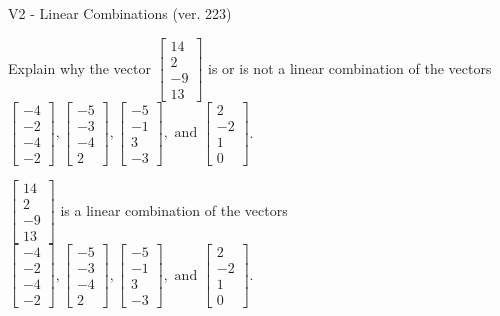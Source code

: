 \begin{exercise}
  \begin{exerciseTitle}V2 - Linear Combinations (ver. 223)\end{exerciseTitle}
  \begin{exerciseStatement}
    Explain why the vector \(\left[\begin{array}{c}
14 \\
2 \\
-9 \\
13
\end{array}\right]\)  is or is not a linear 
	combination of the vectors \(\left[\begin{array}{c}
-4 \\
-2 \\
-4 \\
-2
\end{array}\right] , \left[\begin{array}{c}
-5 \\
-3 \\
-4 \\
2
\end{array}\right] , \left[\begin{array}{c}
-5 \\
-1 \\
3 \\
-3
\end{array}\right] , \text{ and } \left[\begin{array}{c}
2 \\
-2 \\
1 \\
0
\end{array}\right]\).
	


  \end{exerciseStatement}
  \begin{exerciseAnswer}
   \(\left[\begin{array}{c}
14 \\
2 \\
-9 \\
13
\end{array}\right]\) 
  	 is  
	a linear combination of the vectors \(\left[\begin{array}{c}
-4 \\
-2 \\
-4 \\
-2
\end{array}\right] , \left[\begin{array}{c}
-5 \\
-3 \\
-4 \\
2
\end{array}\right] , \left[\begin{array}{c}
-5 \\
-1 \\
3 \\
-3
\end{array}\right] , \text{ and } \left[\begin{array}{c}
2 \\
-2 \\
1 \\
0
\end{array}\right]\).


\end{exerciseAnswer}
\end{exercise}
